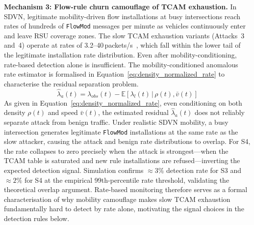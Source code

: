 \documentclass[12pt, a4paper]{report}
\begin{document}
\textbf{Mechanism 3: Flow-rule churn camouflage of TCAM exhaustion.}
In SDVN, legitimate mobility-driven flow installations at busy
intersections reach rates of hundreds of \texttt{FlowMod} messages
per minute as vehicles continuously enter and leave RSU coverage
zones. The slow TCAM exhaustion variants (Attacks~3 and~4) operate
at rates of 3.2--40\,packets/s~\cite{Pascoal2017}, which fall within
the lower tail of the legitimate installation rate distribution.
Even after mobility-conditioning, rate-based detection
alone is insufficient. The mobility-conditioned anomalous
rate estimator is formalised in
Equation~\eqref{eq:density_normalized_rate} to
characterise the residual separation problem.
\begin{equation}
\hat{\lambda}_a(t) = \lambda_{obs}(t) -
\mathbb{E}\!\left[
\lambda_l(t)\,|\,\rho(t),\bar{v}(t)
\right]
\label{eq:density_normalized_rate}
\end{equation}
As given in Equation~\eqref{eq:density_normalized_rate},
even conditioning on both density $\rho(t)$ and speed
$\bar{v}(t)$, the estimated residual $\hat{\lambda}_a(t)$
does not reliably separate attack from benign traffic.
Under realistic \ac{SDVN} mobility, a busy intersection
generates legitimate \texttt{FlowMod} installations at
the same rate as the slow attacker, causing the attack
and benign rate distributions to overlap. For S4, the
rate collapses to zero precisely when the attack is
strongest---when the \ac{TCAM} table is saturated and
new rule installations are refused---inverting the
expected detection signal. Simulation confirms
$\approx 3\%$ detection rate for S3 and $\approx 2\%$
for S4 at the empirical 99th-percentile rate threshold,
validating the theoretical overlap argument. Rate-based
monitoring therefore serves as a formal characterisation
of why mobility camouflage makes slow \ac{TCAM}
exhaustion fundamentally hard to detect by rate alone,
motivating the signal choices in the detection rules
below.
\end{document}
